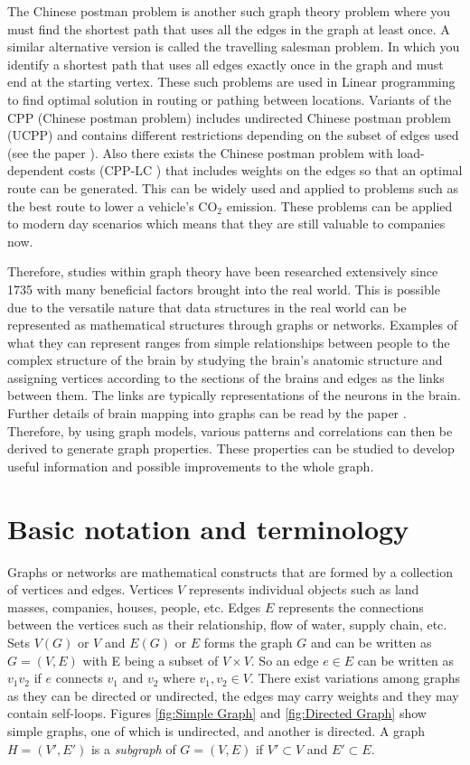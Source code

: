 The Chinese postman problem is another such graph theory problem where you must find the shortest path that uses all the edges in the graph at least once. A similar alternative version is called the travelling salesman problem. In which you identify a shortest path that uses all edges exactly once in the graph and must end at the starting vertex. These such problems are used in Linear programming to find optimal solution in routing or pathing between locations. Variants of the CPP (Chinese postman problem) includes undirected Chinese postman problem (UCPP) and contains different restrictions depending on the subset of edges used (see the paper \cite{IrnichStefan2008Uppw}). Also there exists the Chinese postman problem with load-dependent costs (CPP-LC \cite{CorberánÁngel2018TCPP}) that includes weights on the edges so that an optimal route can be generated. This can be widely used and applied to problems such as the best route to lower a vehicle's CO$_2$ emission. These problems can be applied to modern day scenarios which means that they are still valuable to companies now.
\newline

Therefore, studies within graph theory have been researched extensively since 1735 with many beneficial factors brought into the real world. This is possible due to the versatile nature that data structures in the real world can be represented as mathematical structures through graphs or networks. Examples of what they can represent ranges from simple relationships between people to the complex structure of the brain by studying the brain's anatomic structure and assigning vertices according to the sections of the brains and edges as the links between them. The links are typically representations of the neurons in the brain. Further details of brain mapping into graphs can be read by the paper \cite{articlebrain}. Therefore, by using graph models, various patterns and correlations can then be derived to generate graph properties. These properties can be studied to develop useful information and possible improvements to the whole graph.

\section{Basic notation and terminology}
Graphs or networks are mathematical constructs that are formed by a collection of vertices and edges. Vertices $V$ represents individual objects such as land masses, companies, houses, people, etc. Edges $E$ represents the connections between the vertices such as their relationship, flow of water, supply chain, etc. Sets $V(G)$ or $V$ and $E(G)$ or $E$ forms the graph $G$ and can be written as $G=(V, E)$ with E being a subset of $V \times V$. So an edge $e \in E$ can be written as $v_{1}v_{2}$ if $e$ connects $v_{1}$ and $v_{2}$ where $v_{1}, v_{2} \in V$. There exist variations among graphs as they can be directed or undirected, the edges may carry weights and they may contain self-loops. Figures \ref{fig:Simple Graph} and \ref{fig:Directed Graph} show simple graphs, one of which is undirected, and another is directed. A graph $H = (V', E')$ is a \emph{subgraph} of $G=(V, E)$ if $V' \subset V$ and $E' \subset E$.

